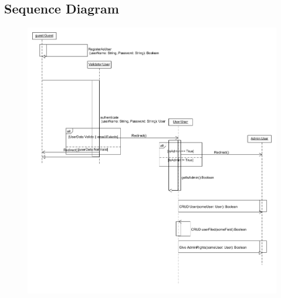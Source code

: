 \subsection{Sequence Diagram}
\begin{figure}[H]
	\includegraphics[width=\textwidth]{User_Management/Sequence_Diagram_User_Management.png}
\end{figure}


